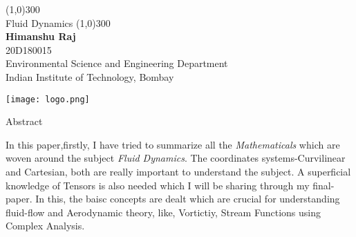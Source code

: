 \documentclass{book}
\begin{document}
\pagestyle{empty}
\begin{center}

\line(1,0){300}\\    %
\vspace{0.3cm}
{\Huge Fluid Dynamics}
\line(1,0){300}\\    %
\vspace{1cm}
\textbf{Himanshu Raj}\\20D180015\\Environmental Science and Engineering Department\\Indian Institute of Technology, Bombay
\\
\vspace{2cm}

\texttt{[image: logo.png]}
\end{center}
\newpage
{\Huge Abstract}
\vspace{0.8cm}

In this paper,firstly, I have tried to summarize all the \emph{Mathematicals} which are woven around the subject \textemdash \emph{Fluid Dynamics}. The coordinates systems-Curvilinear and Cartesian, both are really important to understand the subject. A superficial knowledge of Tensors is also needed which I will be sharing through my final-paper. In this, the baisc concepts are dealt which are crucial for understanding fluid-flow and Aerodynamic theory, like, Vortictiy, Stream Functions using Complex Analysis.
\end{document}
